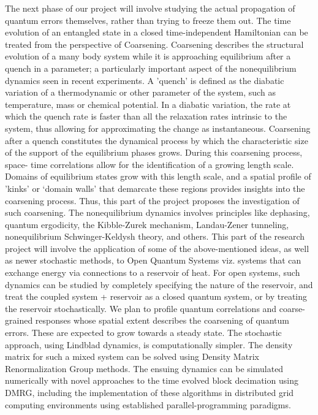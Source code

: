 \documentclass[a4paper,9pt]{article}
\begin{document}
The next phase of our project will involve studying the actual propagation of quantum errors themselves, rather than trying to freeze them out. The time evolution of an entangled state in a closed time-independent Hamiltonian can be treated from the perspective of Coarsening. Coarsening describes the structural evolution of a many body system while it is approaching equilibrium after a quench in a  parameter; a particularly important aspect of the nonequilibrium dynamics seen in recent experiments. A 'quench' is defined as the diabatic variation of a thermodynamic or other  parameter of the system, such as temperature, mass or chemical potential. In a diabatic variation, the rate at which the quench rate is faster than all the relaxation rates intrinsic to the system, thus allowing for approximating the change as instantaneous. Coarsening after a quench constitutes the dynamical process by which the characteristic  size of the support of the equilibrium phases grows. During this coarsening process, space-
time correlations allow for the identification of a growing length scale. Domains of equilibrium states grow with this length scale, and a spatial profile of 'kinks' or  `domain walls' that demarcate these regions provides insights into the coarsening process. Thus, this part of the project proposes the investigation of such coarsening. The nonequilibrium dynamics involves principles like dephasing, quantum ergodicity, the Kibble-Zurek mechanism, Landau-Zener tunneling, nonequilibrium Schwinger-Keldysh theory, and others. This part of the research project will involve the application of some of the above-mentioned ideas, as well as newer stochastic methods, to Open Quantum Systems viz. systems that can exchange energy via connections to a reservoir of heat. For open systems, such dynamics can be studied by completely specifying the nature of the reservoir, and treat the coupled system + reservoir as a closed quantum system, or by treating the reservoir stochastically. We plan to profile quantum correlations 
and coarse-grained responses whose spatial extent describes the coarsening of quantum errors. These are expected to grow towards a steady state. The stochastic approach, using Lindblad dynamics, is computationally simpler. The density matrix for such a mixed system can be solved using Density Matrix Renormalization Group methods. The ensuing dynamics  can be simulated numerically with novel approaches to the time evolved block decimation using DMRG, including the implementation of these algorithms in distributed grid computing environments using established parallel-programming paradigms.
\end{document}

